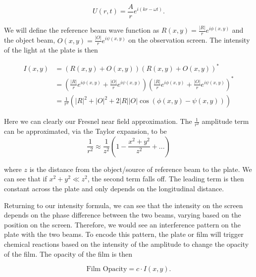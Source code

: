 \documentclass[aps,prl,reprint,10pt,amsmath,amssymb,superscriptaddress,a4paper]{revtex4-2}
\begin{document}
\begin{equation}
    U(r,t) = \frac{A}{r}e^{i(kr-\omega t)}.
\end{equation}

We will define the reference beam wave function as $R(x,y) = \frac{|R|}{r}e^{i\phi(x,y)}$ and the object beam, $O(x,y) = \frac{|O|}{r}e^{i\psi(x,y)}$ on the observation screen. The intensity of the light at the plate is then 

\begin{widetext}
\begin{align} \label{eqn:intensity_object_field}
    I(x,y) &= \left(R(x,y) + O(x,y)\right)\left(R(x,y) + O(x,y)\right)^* \\
    &= \left(\frac{|R|}{r}e^{i\phi(x,y)} + \frac{|O|}{r}e^{i\psi(x,y)}\right)\left(\frac{|R|}{r}e^{i\phi(x,y)} + \frac{|O|}{r}e^{i\psi(x,y)}\right)^* \nonumber \\
    &= \frac{1}{r^2}\left(|R|^2 + |O|^2 + 2|R||O|\cos{(\phi(x,y)-\psi(x,y))}\right) \nonumber
\end{align}
\end{widetext}

Here we can clearly our Fresnel near field approximation. The $\frac{1}{r^2}$ amplitude term can be approximated, via the Taylor expansion, to be
\begin{equation}
    \frac{1}{r^2} \approx \frac{1}{z^2}\left(1-\frac{x^2+y^2}{z^2} + ...\right) 
\end{equation}

where $z$ is the distance from the object/source of reference beam to the plate. We can see that if $x^2 + y^2 \ll z^2$, the second term falls off. The leading 
term is then constant across the plate and only depends on the longitudinal distance.

Returning to our intensity formula, we can see that the intensity on the screen depends on the phase difference between the two beams, varying based on the position 
on the screen. Therefore, we would see an interference pattern on the plate with the two beams. To encode this pattern, the plate or film will trigger chemical reactions 
based on the intensity of the amplitude to change the opacity of the film. The opacity of the film is then 

\begin{equation}
    \text{Film Opacity} = c\cdot I(x,y).
\end{equation}
\end{document}
